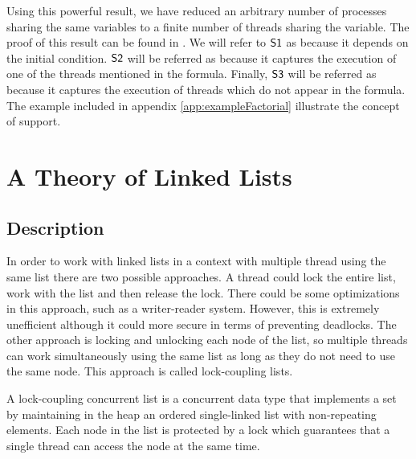 Using this powerful result, we have reduced an arbitrary number of processes sharing the same variables to a finite number of threads sharing the variable. 
%
The proof of this result can be found in .
%
We will refer to $\mathsf{S1}$ as  because it depends on the initial condition.
%
$\mathsf{S2}$ will be referred as  because it captures the execution of one of the threads mentioned in the formula.
%
Finally, $\mathsf{S3}$ will be referred as  because it captures the execution of threads which do not appear in the formula. 
%
The example included in appendix \ref{app:exampleFactorial} illustrate the concept of support. 



\section{A Theory of Linked Lists}

\subsection{Description}

In order to work with linked lists in a context with multiple thread using the same list 
there are two possible approaches. 
%
A thread could lock the entire list, work with the list and then release the lock. 
%
There could be some optimizations in this approach, such as a writer-reader system.
%
However, this is extremely unefficient although it could more secure in terms of preventing deadlocks.
%
The other approach is locking and unlocking each node of the list, so multiple threads can work simultaneously using the same list as long as they do not need to use the same node.
%
This approach is called lock-coupling lists.



\begin{defn}
A lock-coupling concurrent list is 
a concurrent data type that implements a set by maintaining in the heap an 
ordered single-linked list with non-repeating elements.
%
Each node in the list is protected by a lock which guarantees that a 
single thread can access the node at the same time.
%
\end{defn}

